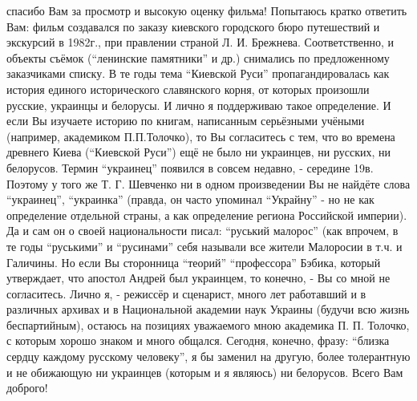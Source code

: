 \begin{itemize}
\begin{itemize}
спасибо Вам за просмотр и высокую оценку фильма! Попытаюсь кратко ответить Вам:
фильм создавался по заказу киевского городского бюро путешествий и экскурсий в
1982г., при правлении страной Л. И. Брежнева. Соответственно, и объекты съёмок
(\enquote{ленинские памятники} и др.) снимались по предложенному заказчиками
списку. В те годы тема \enquote{Киевской Руси} пропагандировалась как история
единого исторического славянского корня, от которых произошли русские, украинцы
и белорусы. И лично я поддерживаю такое определение. И если Вы изучаете историю
по книгам, написанным серьёзными учёными (например, академиком П.П.Толочко), то
Вы согласитесь с тем, что во времена древнего Киева (\enquote{Киевской Руси})
ещё не было ни украинцев, ни русских, ни белорусов. Термин \enquote{украинец} появился
в совсем недавно, - середине 19в. Поэтому у того же Т. Г. Шевченко ни в одном
произведении Вы не найдёте слова \enquote{украинец}, \enquote{украинка}
(правда, он часто упоминал \enquote{Украйну} - но не как определение отдельной
страны, а как определение региона Российской империи). Да и сам он о своей
национальности писал: \enquote{руський малорос} (как впрочем, в те годы
\enquote{руськими} и \enquote{русинами} себя называли все жители Малоросии в
т.ч. и Галичины. Но если Вы сторонница \enquote{теорий} \enquote{профессора}
Бэбика, который утверждает, что апостол Андрей был украинцем, то конечно, - Вы
со мной не согласитесь. Лично я, - режиссёр и сценарист, много лет работавший и
в различных архивах и в Национальной академии наук Украины (будучи всю жизнь
беспартийным), остаюсь на позициях уважаемого мною академика П. П. Толочко, с
которым хорошо знаком и много общался. Сегодня, конечно, фразу: \enquote{близка
сердцу каждому русскому человеку}, я бы заменил на другую, более толерантную и
не обижающую ни украинцев (которым и я являюсь) ни белорусов. Всего Вам
доброго!

\end{itemize} %

\end{itemize} %
